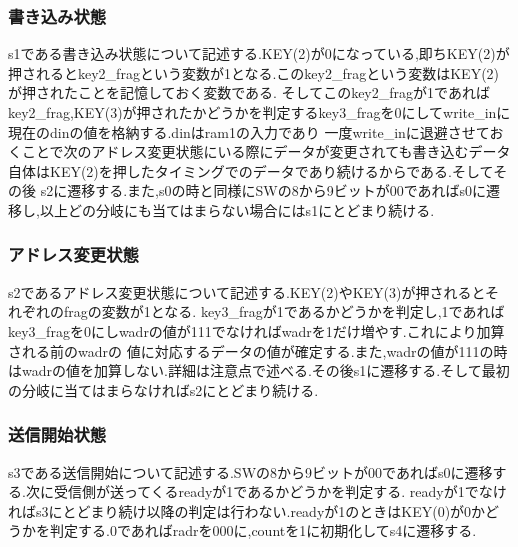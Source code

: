 \documentclass[dvipdfmx]{jarticle}
\begin{document}
\subsubsection{書き込み状態}
s1である書き込み状態について記述する.KEY(2)が0になっている,即ちKEY(2)が押されるとkey2\_fragという変数が1となる.このkey2\_fragという変数はKEY(2)が押されたことを記憶しておく変数である.
そしてこのkey2\_fragが1であればkey2\_frag,KEY(3)が押されたかどうかを判定するkey3\_fragを0にしてwrite\_inに現在のdinの値を格納する.dinはram1の入力であり
一度write\_inに退避させておくことで次のアドレス変更状態にいる際にデータが変更されても書き込むデータ自体はKEY(2)を押したタイミングでのデータであり続けるからである.そしてその後
s2に遷移する.また,s0の時と同様にSWの8から9ビットが00であればs0に遷移し,以上どの分岐にも当てはまらない場合にはs1にとどまり続ける.

\subsubsection{アドレス変更状態}
s2であるアドレス変更状態について記述する.KEY(2)やKEY(3)が押されるとそれぞれのfragの変数が1となる.
key3\_fragが1であるかどうかを判定し,1であればkey3\_fragを0にしwadrの値が111でなければwadrを1だけ増やす.これにより加算される前のwadrの
値に対応するデータの値が確定する.また,wadrの値が111の時はwadrの値を加算しない.詳細は注意点で述べる.その後s1に遷移する.そして最初の分岐に当てはまらなければs2にとどまり続ける.
\subsubsection{送信開始状態}
s3である送信開始について記述する.SWの8から9ビットが00であればs0に遷移する.次に受信側が送ってくるreadyが1であるかどうかを判定する.
readyが1でなければs3にとどまり続け以降の判定は行わない.readyが1のときはKEY(0)が0かどうかを判定する.0であればradrを000に,countを1に初期化してs4に遷移する.
\end{document}
